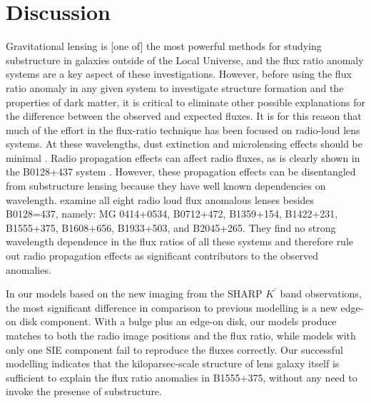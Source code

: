 \documentclass[useAMS,usenatbib]{mn2e}
\begin{document}
\section{Discussion}

Gravitational lensing is [one of] the most powerful methods for
studying substructure in galaxies outside of the Local Universe, and
the flux ratio anomaly systems are a key aspect of these
investigations.  However, before using the flux ratio anomaly in any
given system to investigate structure formation and the properties of
dark matter, it is critical to eliminate other possible explanations
for the difference between the observed and expected fluxes.  It is
for this reason that much of the effort in the flux-ratio technique
has been focused on radio-loud lens systems.  At these wavelengths,
dust extinction and microlensing effects should be minimal
\citep[although see][for a rare example of radio microlensing]{K2000}.
Radio propagation effects can affect radio fluxes, as is clearly shown
in the B0128+437 system \citep{B04}.  However, these propagation
effects can be disentangled from substructure lensing because they
have well known dependencies on wavelength. \citet{KD04} examine all
eight radio loud flux anomalous lenses besides B0128=437, namely: MG
0414+0534, B0712+472, B1359+154, B1422+231, B1555+375, B1608+656,
B1933+503, and B2045+265.  They find no strong wavelength dependence
in the flux ratios of all these systems and therefore rule out radio
propagation effects as significant contributors to the observed
anomalies.

In our models based on the new imaging from the SHARP $K^{\prime}$
band observations, the most significant difference in comparison to
previous modelling is a new edge-on disk component. With a bulge plus
an edge-on disk, our models produce matches to both the radio image
positions and the flux ratio, while models with only one SIE
component \citep{Marlow,Xu14} fail to reproduce the fluxes
correctly. Our successful modelling indicates that the
kiloparsec-scale structure of lens galaxy itself is sufficient to
explain the flux ratio anomalies in B1555+375, without any need to
invoke the presense of substructure.  

\end{document}
